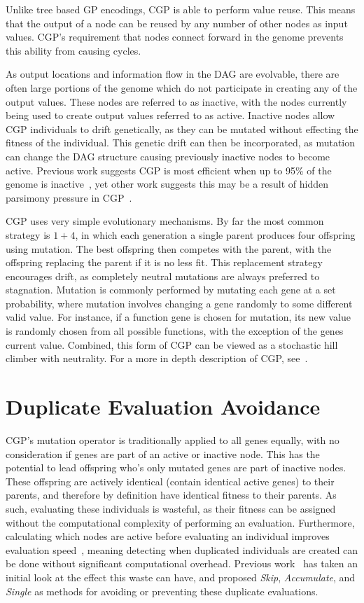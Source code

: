 \documentclass[journal]{IEEEtran}
\begin{document}
Unlike tree based GP encodings, CGP is able to perform value reuse.  This means
that the output of a node can be reused by any number of other nodes as input values.
CGP's requirement that nodes connect forward in the genome prevents this ability
from causing cycles.

As output locations and information flow in the DAG are evolvable, there are often
large portions of the genome which do not participate in creating any of the
output values.  These nodes are referred to as inactive, with the nodes currently
being used to create output values referred to as active.  Inactive nodes
allow CGP individuals to drift genetically, as they can be mutated without effecting
the fitness of the individual.  This genetic drift can then be incorporated, as
mutation can change the DAG structure causing previously inactive nodes to become
active.  Previous work suggests CGP is most efficient when up to 95\% of the genome
is inactive~\cite{miller:2006:redundancy}, yet other work suggests this may
be a result of hidden parsimony pressure in CGP~\cite{goldman:2013:ordering}.

CGP uses very simple evolutionary mechanisms.  By far the most common strategy
is $1+4$, in which each generation a single parent produces four offspring using
mutation.  The best offspring then competes with the parent, with the offspring
replacing the parent if it is no less fit.  This replacement strategy encourages
drift, as completely neutral mutations are always preferred to stagnation.  Mutation
is commonly performed by mutating each gene at a set probability, where mutation
involves changing a gene randomly to some different valid value.  For instance,
if a function gene is chosen for mutation, its new value is randomly chosen from
all possible functions, with the exception of the genes current value.  Combined,
this form of CGP can be viewed as a stochastic hill climber with neutrality.
For a more in depth description of CGP, see~\cite{miller:2011:chapter2}.

\section{Duplicate Evaluation Avoidance}
\label{sec:duplicate}
CGP's mutation operator is traditionally applied to all genes equally, with no
consideration if genes are part of an active or inactive node.  This has the
potential to lead offspring who's only mutated genes are part of inactive nodes.
These offspring are actively identical (contain identical active genes) to their
parents, and therefore by definition have identical fitness to their parents.
As such, evaluating these individuals is wasteful, as their fitness can be
assigned without the computational complexity of performing an evaluation.
Furthermore, calculating which nodes are active before evaluating an individual
improves evaluation speed~\cite{vasicek:2012:efficient}, meaning detecting when duplicated individuals are
created can be done without significant computational overhead.
Previous work~\cite{goldman:2013:cgpwaste} has taken an initial look at the
effect this waste can have, and proposed \emph{Skip}, \emph{Accumulate}, and
\emph{Single} as methods for avoiding or preventing these duplicate evaluations.
\end{document}
